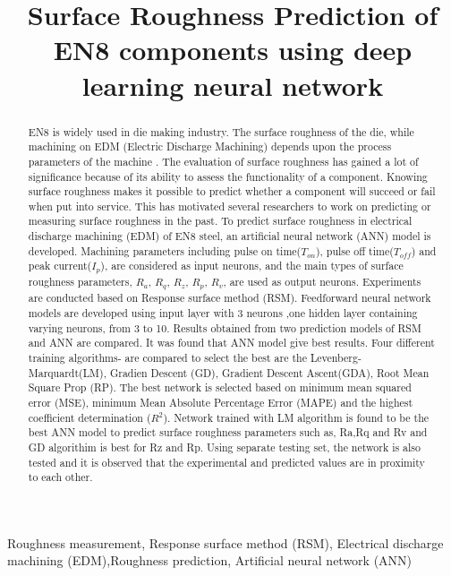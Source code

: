 \documentclass[suppldata]{interact}
\begin{document}
\title{  Surface Roughness Prediction of EN8 components using deep learning neural network}
\author{
}
\maketitle

\begin{abstract}
 EN8  is widely used in die making industry. The surface roughness of the die, while machining on EDM (Electric Discharge Machining) depends upon the process parameters of the machine \cite{joshi2020edm}. The evaluation of surface roughness has gained a lot of significance because of its ability to assess the functionality of a component. Knowing surface roughness makes it possible to predict whether a component will succeed or fail when put into service. This has motivated several researchers to work on predicting or measuring surface roughness in the past.   To predict surface roughness in electrical discharge machining (EDM) of EN8 steel, an artificial neural network (ANN) model is developed. Machining parameters including pulse on time($T_{on}$), pulse off time($T_{off}$) and peak current($I_p$),  are considered as input neurons, and the main types of surface roughness parameters, $R_a$, $R_q$, $R_z$, $R_p$, $R_v$, are used as output neurons.   Experiments are conducted based on Response surface method (RSM). Feedforward neural network models are developed using input layer with 3 neurons ,one hidden layer containing varying neurons, from 3 to 10. Results obtained from two prediction models  of RSM and ANN are compared. It was found that ANN model give best results. Four different training algorithms- are compared to select the best are the Levenberg-Marquardt(LM), Gradien Descent (GD), Gradient Descent Ascent(GDA), Root Mean Square Prop (RP). The best network is selected based on minimum mean squared error (MSE), minimum Mean Absolute Percentage Error (MAPE) and the highest coefficient determination ($R^2$). Network trained with LM algorithm is found to be the best ANN model to predict surface roughness parameters such as, Ra,Rq and Rv and GD algorithim is best for Rz and Rp. Using separate testing set, the network is also tested and it is observed that the experimental and predicted values are in proximity to each other.
  \end{abstract}
 \begin{keywords}
     Roughness measurement, Response surface method (RSM), Electrical discharge machining (EDM),Roughness prediction, Artificial neural network (ANN)
\end{keywords}
\end{document}
